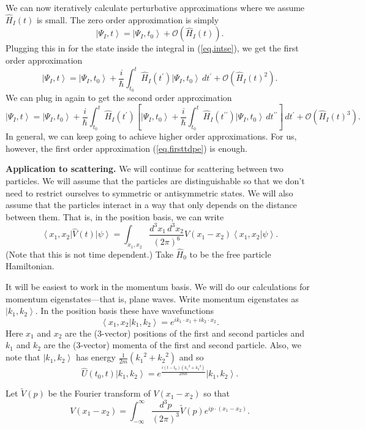 \documentclass[11pt]{article}
\newcommand{\Od}[1]{\mathcal{O}{\left(#1\right)}}
\newcommand{\bra}[1]{\left\langle#1\right|}
\newcommand{\ket}[1]{\left|#1\right\rangle}
\newcommand{\braket}[2]{\left\langle#1|#2\right\rangle}
\newcommand{\op}[1]{\hat{#1}}
\theoremstyle{theorem}
\theoremstyle{remark}
\theoremstyle{step}
\theoremstyle{gap}
\begin{document}
We can now iteratively calculate perturbative approximations where we assume \(\op{H}_I(t)\) is small. The zero order approximation is simply
\[\ket{\Psi_I, t} = \ket{\Psi_I, t_0} + \Od{\op{H}_I(t)}.\]
Plugging this in for the state inside the integral in (\ref{eq.intse}), we get the first order approximation
\begin{equation}\label{eq.firsttdpe}
\ket{\Psi_I, t} = \ket{\Psi_I, t_0} + \frac{i}{\hbar} \int_{t_0}^t \op{H}_I(t^\prime)\ket{\Psi_I, t_0} \,dt^\prime + \Od{\op{H}_I(t)^2}.
\end{equation}
We can plug in again to get the second order approximation
\[
\ket{\Psi_I, t} = \ket{\Psi_I, t_0} + \frac{i}{\hbar} \int_{t_0}^t \op{H}_I(t^\prime)\left[\ket{\Psi_I, t_0} + \frac{i}{\hbar} \int_{t_0}^t \op{H}_I(t^{\prime\prime})\ket{\Psi_I, t_0} \,dt^{\prime\prime}\right] \,dt^\prime + \Od{\op{H}_I(t)^3}.
\]
In general, we can keep going to achieve higher order approximations. For us, however, the first order approximation (\ref{eq.firsttdpe}) is enough.

{\bf Application to scattering.} We will continue for scattering between two particles. We will assume that the particles are distinguishable so that we don't need to restrict ourselves to symmetric or antisymmetric states. We will also assume that the particles interact in a way that only depends on the distance between them. That is, in the position basis, we can write \[\bra{x_1, x_2}\op{V}(t)\ket{\psi} = \int_{x_1,x_2} \frac{d^3 x_1 \,d^3x_2}{(2\pi)^6} V(x_1 - x_2) \braket{x_1, x_2}{\psi}.\] (Note that this is not time dependent.) Take \(\op{H}_0\) to be the free particle Hamiltonian.

It will be easiest to work in the momentum basis. We will do our calculations for momentum eigenstates---that is, plane waves. Write momentum eigenstates as \(\ket{k_1, k_2}\). In the position basis these have wavefunctions
\[\braket{x_1, x_2}{k_1, k_2} = e^{ik_1\cdot x_1 + ik_2\cdot x_2}.\]
Here \(x_1\) and \(x_2\) are the (3-vector) positions of the first and second particles and \(k_1\) and \(k_2\) are the (3-vector) momenta of the first and second particle. Also, we note that \(\ket{k_1, k_2}\) has energy \(\frac{1}{2m} \left({k_1}^2 + {k_2}^2\right)\) and so
\begin{equation}
\label{eq.timeevonk}
\op{U}(t_0, t) \ket{k_1, k_2} = e^{\frac{i\left(t-t_0\right)\left({k_1}^2 + {k_2}^2\right)}{2m\hbar}} \ket{k_1, k_2}.
\end{equation}

Let \(\widetilde{V}(p)\) be the Fourier transform of \(V(x_1 - x_2)\) so that
\begin{equation}
\label{eq.ftV}
V(x_1 - x_2) = \int_{-\infty}^{\infty} \frac{d^3 p}{(2 \pi)^3} \widetilde{V}(p) e^{ip\cdot(x_1 - x_2)}.
\end{equation}
\end{document}
